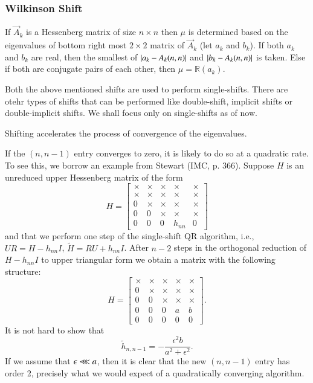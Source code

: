 \documentclass[journal]{IEEEtran}
\numberwithin{equation}{section}
\begin{document}
\subsubsection{Wilkinson Shift} If $\vec{A}_k$ is a Hessenberg matrix of size $n \times n$ then $\mu$ is determined based on the eigenvalues of bottom right most $2\times 2$ matrix of $\vec{A}_k$ (let $a_k$ and $b_k$). If both $a_k$ and $b_k$ are real, then the smallest of $\left\vert a_k - A_k(n,n)\right\vert$ and $\left\vert b_k - A_k(n,n)\right\vert$ is taken. Else if both are conjugate pairs of each other, then $\mu = \mathbb{R}(a_k)$.

Both the above mentioned shifts are used to perform single-shifts. There are otehr types of shifts that can be performed like double-shift, implicit shifts or double-implicit shifts. We shall focus only on single-shifts as of now.

Shifting accelerates the process of convergence of the eigenvalues.

If the \((n, n-1)\) entry converges to zero, it is likely to do so at a quadratic rate. To see this, we borrow an example from Stewart (IMC, p. 366). Suppose \(H\) is an unreduced upper Hessenberg matrix of the form
$$
H = \begin{bmatrix}
\times & \times & \times & \times & \times \\
\times & \times & \times & \times & \times \\
0 & \times & \times & \times & \times \\
0 & 0 & \times & \times & \times \\
0 & 0 & 0 & h_{nn} & 0
\end{bmatrix}
$$
and that we perform one step of the single-shift QR algorithm, i.e., \(UR = H - h_{nn}I\), \(\tilde{H} = RU + h_{nn}I\). After \(n-2\) steps in the orthogonal reduction of \(H - h_{nn}I\) to upper triangular form we obtain a matrix with the following structure:
$$
H = \begin{bmatrix}
\times & \times & \times & \times & \times \\
0 & \times & \times & \times & \times \\
0 & 0 & \times & \times & \times \\
0 & 0 & 0 & a & b \\
0 & 0 & 0 & 0 & 0
\end{bmatrix} .
$$
It is not hard to show that
$$
\tilde{h}_{n,n-1} = -\frac{\epsilon^2b}{a^2 + \epsilon^2} .
$$
If we assume that \(\epsilon \llless a\), then it is clear that the new \((n, n-1)\) entry has order 2, precisely what we would expect of a quadratically converging algorithm.
\end{document}
